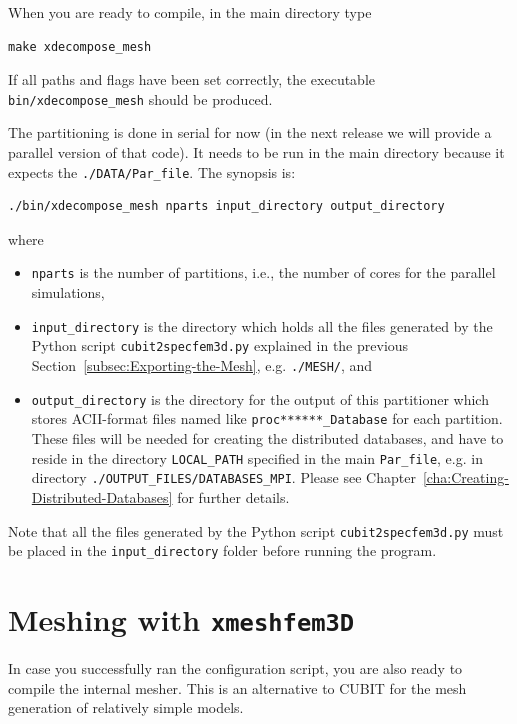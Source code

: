 When you are ready to compile, in the main directory type
{\small
\begin{verbatim}
make xdecompose_mesh
\end{verbatim}
}
If all paths and flags have been set correctly, the executable \texttt{bin/xdecompose\_mesh}
should be produced.

The partitioning is done in serial for now (in the next release we
will provide a parallel version of that code). It needs to be run in the main directory because it expects the \texttt{./DATA/Par\_file}. The synopsis is:
\begin{verbatim}
./bin/xdecompose_mesh nparts input_directory output_directory
\end{verbatim}
where
\begin{itemize}
\item \texttt{nparts} is the number of partitions, i.e., the number of cores
for the parallel simulations,
\item \texttt{input\_directory} is the directory which holds all the files
generated by the Python script \texttt{cubit2specfem3d.py} explained
in the previous Section~\ref{subsec:Exporting-the-Mesh}, e.g. \texttt{./MESH/},
and
\item \texttt{output\_directory} is the directory for the output of this
partitioner which stores ACII-format files named like \texttt{proc{*}{*}{*}{*}{*}{*}\_Database}
for each partition. These files will be needed for creating the distributed
databases, and have to reside in the directory \texttt{LOCAL\_PATH}
specified in the main \texttt{Par\_file}, e.g. in directory \texttt{./OUTPUT\_FILES/DATABASES\_MPI}.
Please see Chapter~\ref{cha:Creating-Distributed-Databases} for
further details.
\end{itemize}
Note that all the files generated by the Python script \texttt{cubit2specfem3d.py}
must be placed in the \texttt{input\_directory} folder before running
the program.


\section{Meshing with \texttt{xmeshfem3D}}\label{cha:Running-the-Mesher-Meshfem3D}

In case you successfully ran the configuration script, you are also
ready to compile the internal mesher. This is an alternative to CUBIT
for the mesh generation of relatively simple models.

